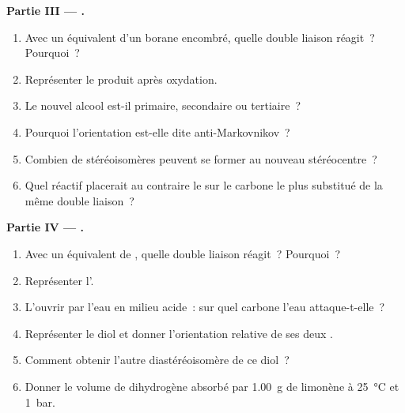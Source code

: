 \begin{problem}
\medskip
\noindent\textbf{Partie III --- .}
\begin{enumerate}[resume]
  \item Avec un équivalent d'un borane encombré, quelle double liaison réagit~? Pourquoi~?
  \item Représenter le produit après oxydation.
  \item Le nouvel alcool est-il primaire, secondaire ou tertiaire~?
  \item Pourquoi l'orientation est-elle dite anti-Markovnikov~?
  \item Combien de stéréoisomères peuvent se former au nouveau stéréocentre~?
  \item Quel réactif placerait au contraire le  sur le carbone le plus substitué de la
        même double liaison~?
\end{enumerate}

\medskip
\noindent\textbf{Partie IV --- .}
\begin{enumerate}[resume]
  \item Avec un équivalent de , quelle double liaison réagit~? Pourquoi~?
  \item Représenter l'.
  \item L'ouvrir par l'eau en milieu acide~: sur quel carbone l'eau attaque-t-elle~?
  \item Représenter le diol et donner l'orientation relative de ses deux .
  \item Comment obtenir l'autre diastéréoisomère de ce diol~?
  \item Donner le volume de dihydrogène absorbé par \qty{1.00}{g} de limonène à
        \qty{25}{\degreeCelsius} et \qty{1}{bar}.
\end{enumerate}
\end{problem}
